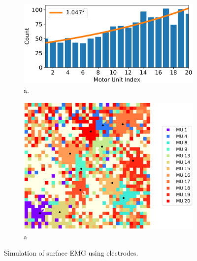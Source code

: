 \begin{figure}
  \centering%
  \begin{subfigure}[t]{0.45\textwidth}%
    \centering%
    \includegraphics[width=\textwidth]{images/results/application/newmus1.pdf}%
    \caption{a.}%
    \label{fig:newmus_progression}%
  \end{subfigure}\hfill
  \begin{subfigure}[t]{0.45\textwidth}%
    \centering%
    \includegraphics[width=\textwidth]{images/results/application/newmus3.pdf}%
    \caption{a}%
    \label{fig:newmus_2d}%
  \end{subfigure} 
  \caption{Simulation of surface EMG using electrodes.}%
  \label{fig:newmus}%
\end{figure}

